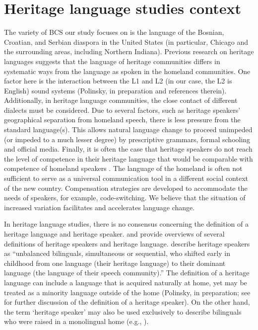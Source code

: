 \documentclass[output=paper,modfonts,nonflat,
]{langsci/langscibook}
\begin{document}
\section{Heritage language studies context}\label{sec:mihajlovic:2}

The variety of BCS our study focuses on is the language of the Bosnian, Croatian, and Serbian diaspora in the United States (in particular, Chicago and the surrounding areas, including Northern Indiana). Previous research on heritage languages suggests that the language of heritage communities differs in systematic ways from the language as spoken in the homeland communities. One factor here is the interaction between the L1 and L2 (in our case, the L2 is English) sound systems (Polinsky, in preparation and references therein). Additionally, in heritage language communities, the close contact of different dialects must be considered. Due to several factors, such as heritage speakers’ geographical separation from homeland speech, there is less pressure from the standard language(s). This allows natural language change to proceed unimpeded (or impeded to a much lesser degree) by prescriptive grammars, formal schooling and official media. Finally, it is often the case that heritage speakers do not reach the level of competence in their heritage language that would be comparable with competence of homeland speakers \citep{ScontrasEtAl2015}. The language of the homeland is often not sufficient to serve as a universal communication tool in a different social context of the new country. Compensation strategies are developed to accommodate the needs of speakers, for example, code-switching. We believe that the situation of increased variation facilitates and accelerates language change.



In heritage language studies, there is no consensus concerning the definition of a heritage language and heritage speaker. \citet{Polinskyinprep} and \citet{Kelleher2010} provide overviews of several definitions of heritage speakers and heritage language. \citet[1]{ScontrasEtAl2015} describe heritage speakers as “unbalanced bilinguals, simultaneous or sequential, who shifted early in childhood from one language (their heritage language) to their dominant language (the language of their speech community).” The definition of a heritage language can include a language that is acquired naturally at home, yet may be treated as a minority language outside of the home (Polinsky, in preparation; see \citealt{Kupisch2013} for further discussion of the definition of a heritage speaker). On the other hand, the term ‘heritage speaker’ may also be used exclusively to describe bilinguals who were raised in a monolingual home (e.g., \citealt{PolinskyKagan2007}).
\end{document}
